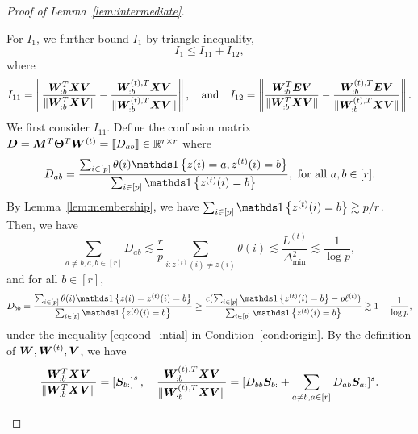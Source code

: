 \documentclass[lettersize,onecolumn,journal]{IEEEtran}
\theoremstyle{definition}
\theoremstyle{definition}
\newcommand{\off}[1]{\left[#1\right]}
\newcommand{\offf}[1]{\left\{#1\right\}}
\begin{document}
\begin{proof}[Proof of Lemma~\ref{lem:intermediate}]
\begin{enumerate}[wide]
    For $I_1$, we further bound $I_1$ by triangle inequality,
    \begin{equation}
        I_1 \leq I_{11} + I_{12},
    \end{equation}
    where
 \begin{equation}
        I_{11} = \left\lVert \frac{ \bm{W}_{:b}^T \bm X \bm{V}  }{\lVert  \bm{W}_{:b}^T \bm X \bm{V} \rVert} - \frac{ \bm{W}_{:b}^{(t), T} \bm X \bm{V}  }{ \lVert\bm{W}_{:b}^{(t), T} \bm X \bm{V} \rVert}   \right\rVert, \quad \text{and} \quad I_{12} = \left\lVert \frac{\bm{W}_{:b}^T \bm{E} \bm{V}}{ \lVert  \bm{W}_{:b}^T \bm X \bm{V} \rVert} - \frac{\bm{W}_{:b}^{(t),T} \bm{E} \bm{V}}{ \lVert  \bm{W}_{:b}^{(t),T} \bm X \bm{V} \rVert} \right\rVert.
    \end{equation}
    We first consider $I_{11}$. Define the confusion matrix $\bm{D} = \bm M^T \boldsymbol{\Theta}^T \bm{W}^{(t)} = \llbracket D_{ab} \rrbracket \in \mathbb{R}^{r \times r}$ where 
    \begin{equation}
        D_{ab} = \frac{\sum_{i \in [p]}  \theta(i) \ind \offf{ z(i) = a, z^{(t)}(i) = b } }{\sum_{i \in [p]}  \ind\offf{  z^{(t)}(i) = b }}, \text{  for all } a, b \in [r].
    \end{equation}
    By Lemma~\ref{lem:membership},  we have $\sum_{i \in [p]}  \ind\offf{  z^{(t)}(i) = b } \gtrsim p/r$. Then, we have
    \begin{equation}\label{eq:dab_bound}
        \sum_{a \neq b, a,b \in [r]} D_{ab} \lesssim \frac{r}{p} \sum_{i \colon z^{(t)}(i) \neq z(i)} \theta(i) \lesssim\frac{L^{(t)}}{\Delta_{\min}^2}  \lesssim \frac{1}{\log p}, 
    \end{equation}
    and for all $b \in [r]$,
    \begin{equation}\label{eq:dbb_bound}
        D_{bb} = \frac{\sum_{i \in [p]}  \theta(i) \ind \offf{ z(i) = z^{(t)}(i) = b } }{\sum_{i \in [p]}  \ind\offf{  z^{(t)}(i) = b }} \geq \frac{c(\sum_{i \in [p]}  \ind\offf{  z^{(t)}(i) = b } - p\ell^{(t)})}{\sum_{i \in [p]}  \ind\offf{  z^{(t)}(i) = b }} \gtrsim 1 - \frac{1}{\log p},
    \end{equation}
    under the inequality \eqref{eq:cond_intial} in Condition~\ref{cond:origin}. By the definition of $\bm{W},\bm{W}^{(t)},\bm{V}$, we have 
    \begin{equation}
        \frac{ \mW_{:b}^T \mX \mV  }{\onormSize{}{  \mW_{:b}^T \mX \mV }} = \off{\mS_{b:}}^s, \quad \frac{ \mW_{:b}^{(t), T} \mX \mV  }{ \onormSize{}{\mW_{:b}^{(t), T} \mX \mV }} = [D_{bb} \mS_{b:} + \sum_{a \neq b, a \in [r]} D_{ab} \mS_{a:}]^s.
    \end{equation}


\end{enumerate}
\end{proof}
\end{document}

